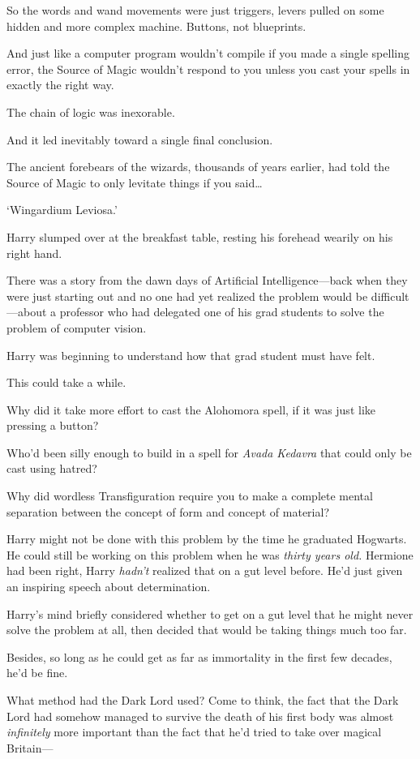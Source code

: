 So the words and wand movements were just triggers, levers pulled on some hidden and more complex machine. Buttons, not blueprints.

And just like a computer program wouldn’t compile if you made a single spelling error, the Source of Magic wouldn’t respond to you unless you cast your spells in exactly the right way.

The chain of logic was inexorable.

And it led inevitably toward a single final conclusion.

The ancient forebears of the wizards, thousands of years earlier, had told the Source of Magic to only levitate things if you said…

‘Wingardium Leviosa.’

Harry slumped over at the breakfast table, resting his forehead wearily on his right hand.

There was a story from the dawn days of Artificial Intelligence—back when they were just starting out and no one had yet realized the problem would be difficult—about a professor who had delegated one of his grad students to solve the problem of computer vision.

Harry was beginning to understand how that grad student must have felt.

This could take a while.

Why did it take more effort to cast the Alohomora spell, if it was just like pressing a button?

Who’d been silly enough to build in a spell for \emph{Avada Kedavra} that could only be cast using hatred?

Why did wordless Transfiguration require you to make a complete mental separation between the concept of form and concept of material?

Harry might not be done with this problem by the time he graduated Hogwarts. He could still be working on this problem when he was \emph{thirty years old.} Hermione had been right, Harry \emph{hadn’t} realized that on a gut level before. He’d just given an inspiring speech about determination.

Harry’s mind briefly considered whether to get on a gut level that he might never solve the problem at all, then decided that would be taking things much too far.

Besides, so long as he could get as far as immortality in the first few decades, he’d be fine.

What method had the Dark Lord used? Come to think, the fact that the Dark Lord had somehow managed to survive the death of his first body was almost \emph{infinitely} more important than the fact that he’d tried to take over magical Britain—

